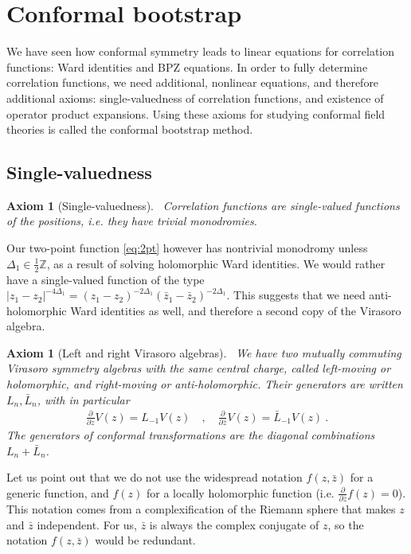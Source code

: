 \documentclass[12pt, a4paper]{article}
\theoremstyle{break}
\newtheorem{hyp}[exo]{Axiom}
\begin{document}
\section{Conformal bootstrap}

We have seen how conformal symmetry leads to linear equations for correlation functions: Ward identities and BPZ equations. 
In order to fully determine correlation functions, we need additional, nonlinear equations, and therefore additional axioms: single-valuedness of correlation functions, and existence of operator product expansions. 
Using these axioms for studying conformal field theories is called the conformal bootstrap method. 

\subsection{Single-valuedness}\label{sec:sv}

\begin{hyp}[Single-valuedness]
 ~\label{hyp:sv}
 Correlation functions are single-valued functions of the positions, i.e. they have trivial monodromies.
\end{hyp}
Our two-point function \eqref{eq:2pt} however has nontrivial monodromy unless $\Delta_1\in \frac12\mathbb{Z}$, as a  result of solving holomorphic Ward identities. 
We would rather have a single-valued function of the type $|z_1-z_2|^{-4\Delta_1} = (z_1-z_2)^{-2\Delta_1} (\bar z_1-\bar z_2)^{-2\Delta_1}$.
This suggests that we need anti-holomorphic Ward identities as well, and therefore a second copy of the Virasoro algebra.

\begin{hyp}[Left and right Virasoro algebras]
 ~\label{hyp:lr}
 We have two mutually commuting Virasoro symmetry algebras with the same central charge, called left-moving or holomorphic, and right-moving or anti-holomorphic. Their generators are written $L_n,\bar L_n$, with in particular
 \begin{align}
  \frac{\partial}{\partial z} V(z) = L_{-1}V(z)   \quad , \quad \frac{\partial}{\partial \bar z} V(z)= \bar L_{-1} V(z)   \ .
 \end{align}
 The generators of conformal transformations are the diagonal combinations $L_n+\bar L_n$.
\end{hyp}
Let us point out that we do not use the widespread notation $f(z,\bar z)$ for a generic function, and $f(z)$ for a locally holomorphic function (i.e. $\frac{\partial}{\partial \bar z}f(z)=0$). This notation comes from a complexification of the Riemann sphere that makes $z$ and $\bar z$ independent. For us, $\bar z$ is always the complex conjugate of $z$, so the notation $f(z,\bar z)$ would be redundant. 
\end{document}

